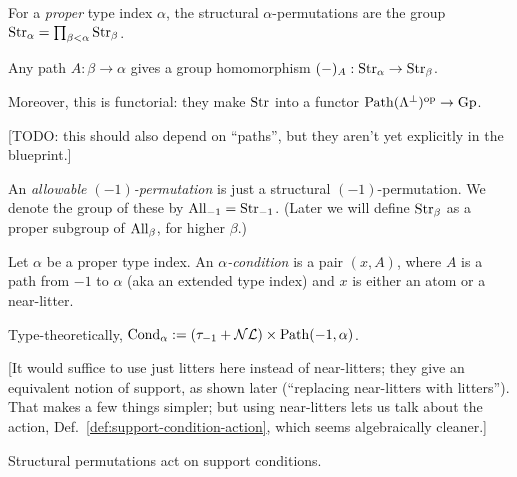 \begin{definition}
  \label{def:structural-perm}
  \leanok
  For a \emph{proper} type index $\alpha$, the structural $\alpha$-permutations are the group $\mathrm{Str}_\alpha = \prod_{\beta < \alpha} \mathrm{Str}_\beta$.
\end{definition}

\begin{definition}
  \label{def:structural-perm-derivative}
  \leanok
  Any path $A : \beta \to \alpha$ gives a group homomorphism $(-)_A : \mathrm{Str}_\alpha \to \mathrm{Str}_\beta$.

  Moreover, this is functorial: they make $\mathrm{Str}$ into a functor $\mathrm{Path}(\Lambda^\bot)^{\mathrm{op}} \to \mathrm{Gp}$.

  [TODO: this should also depend on “paths”, but they aren’t yet explicitly in the blueprint.]
\end{definition}

\begin{definition}
  \label{def:allowable-perm-atoms}
  An \emph{allowable $(-1)$-permutation} is just a structural $(-1)$-permutation. We denote the group of these by $\mathrm{All}_{-1} = \mathrm{Str}_{-1}$.  (Later we will define $\mathrm{Str}_\beta$ as a proper subgroup of $\mathrm{All}_\beta$, for higher $\beta$.)
\end{definition}

\begin{definition}
  \label{def:support-condition}
  \leanok
  Let $\alpha$ be a proper type index. An \emph{$\alpha$-condition} is a pair $(x,A)$, where $A$ is a path from $-1$ to $\alpha$ (aka an extended type index) and $x$ is either an atom or a near-litter.

  Type-theoretically, $\mathrm{Cond}_\alpha := (\tau_{-1} + \mathcal{NL}) \times \mathrm{Path}(-1,\alpha)$.

  [It would suffice to use just litters here instead of near-litters; they give an equivalent notion of support, as shown later (“replacing near-litters with litters”).  That makes a few things simpler; but using near-litters lets us talk about the action, Def.~\ref{def:support-condition-action}, which seems algebraically cleaner.]
\end{definition}

\begin{definition}
\label{def:support-condition-action}
\leanok
Structural permutations act on support conditions.
\end{definition}

